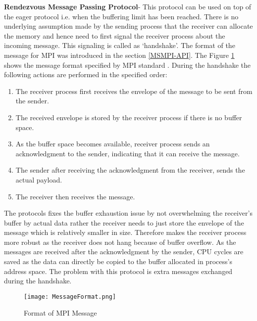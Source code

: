 \textbf{Rendezvous Message Passing Protocol}- This protocol can be used on top of the eager protocol i.e. when the buffering limit has been reached. There is no underlying assumption made by the sending process that the receiver can allocate the memory and hence need to first signal the receiver process about the incoming message. This signaling is called as {\lq}handshake{\rq}. The format of the message for MPI was introduced in the  section \ref{MSMPI-API}. The Figure \ref{fig:MessageFormat} shows the message format specified by MPI standard \cite{mpiMsgForm}. During the handshake the following actions are performed in the specified order: 

\begin{enumerate}
\item The receiver process first receives the envelope of the message to be sent from the sender.
\item The received envelope is stored by the receiver process if there is no buffer space. 
\item As the buffer space becomes available, receiver process sends an acknowledgment to the sender, indicating that it can receive the message.
\item The sender after receiving the acknowledgment from the receiver, sends the actual payload. 
\item The receiver then receives the message. 
\end{enumerate}   

The protocols fixes the buffer exhaustion issue by not overwhelming the receiver's buffer by actual data rather the receiver needs to just store the envelope of the message which is relatively smaller in size. Therefore makes the receiver process more robust as the receiver does not hang because of buffer overflow. As the messages are received after the acknowledgment by the sender, CPU cycles are saved as the data can directly be copied to the buffer allocated in process's address space. The problem with this protocol is extra messages exchanged during the handshake. 

\begin{figure}[ht!]
\centering
\texttt{[image: MessageFormat.png]}
\caption{Format of MPI Message}
\label{fig:MessageFormat}
\end{figure}

